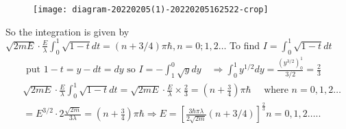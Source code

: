 \begin{enumerate}
\begin{answer}
\begin{minipage}{0.5\textwidth}
\begin{figure}[H]
	\centering
	\texttt{[image: diagram-20220205(1)-20220205162522-crop]}
\end{figure}
\end{minipage}
So the integration is given by $\sqrt{2 m E} \cdot \frac{E}{\lambda} \int_{0}^{1} \sqrt{1-t} d t=(n+3 / 4) \pi \hbar, n=0 ; 1,2 \ldots$ To find $I=\int_{0}^{1} \sqrt{1-t} d t$\\
\begin{align*}
	&\text { put } 1-t=y-d t=d y \text { so } I=-\int_{1}^{0} \sqrt{y} d y \quad \Rightarrow \int_{0}^{1} y^{1 / 2} d y=\frac{\left(y^{3 / 2}\right)_{0}^{1}}{3 / 2}=\frac{2}{3} \\
	&\sqrt{2 m E} \cdot \frac{E}{\lambda} \int_{0}^{1} \sqrt{1-t} d t=\sqrt{2 m E} \cdot \frac{E}{\lambda} \times \frac{2}{3}=\left(n+\frac{3}{4}\right) \pi \hbar \quad \text { where } n=0,1,2 \ldots \\
	&=E^{3 / 2} \cdot 2 \frac{\sqrt{2 m}}{3 \lambda}=\left(n+\frac{3}{4}\right) \pi \hbar \Rightarrow E=\left[\frac{3 \hbar \pi \lambda}{2 \sqrt{2 m}}(n+3 / 4)\right]^{\frac{2}{3}} n=0,1,2 \ldots . .
\end{align*}	
\end{answer}
 \end{enumerate}
 

 
 
 
 
 
 
 
 
